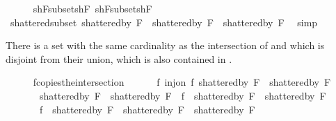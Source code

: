 \begin{isabellebody}
\isanewline
\ \ \ \ \isamarkupfalse%
\ shF{}{\isacharunderscore}{\kern0pt}subset{\isacharunderscore}{\kern0pt}shF\ shF{}{\isacharunderscore}{\kern0pt}subset{\isacharunderscore}{\kern0pt}shF\ \isanewline
\ \ \ \ \isamarkupfalse%
\ shattered{\isacharunderscore}{\kern0pt}subset{\isacharcolon}{\kern0pt}\ {\isachardoublequoteopen}{\isacharparenleft}{\kern0pt}shattered{\isacharunderscore}{\kern0pt}by\ {\isacharquery}{\kern0pt}F{}{\isacharparenright}{\kern0pt}\ {\isasymunion}\ {\isacharparenleft}{\kern0pt}shattered{\isacharunderscore}{\kern0pt}by\ {\isacharquery}{\kern0pt}F{}{\isacharparenright}{\kern0pt}\ {\isasymsubseteq}\ shattered{\isacharunderscore}{\kern0pt}by\ F{\isachardoublequoteclose}\ \isamarkupfalse%
\ simp%
\begin{isamarkuptext}%
There is a set with the same cardinality as the intersection of 
         and  which is disjoint from their union, 
        which is also contained in .%
\end{isamarkuptext}\isamarkuptrue%
\ \ \ \ \isamarkupfalse%
\ f{\isacharunderscore}{\kern0pt}copies{\isacharunderscore}{\kern0pt}the{\isacharunderscore}{\kern0pt}intersection{\isacharcolon}{\kern0pt}\isanewline
\ \ \ \ \ \ {\isachardoublequoteopen}{\isasymexists}f{\isachardot}{\kern0pt}\ inj{\isacharunderscore}{\kern0pt}on\ f\ {\isacharparenleft}{\kern0pt}shattered{\isacharunderscore}{\kern0pt}by\ {\isacharquery}{\kern0pt}F{}\ {\isasyminter}\ shattered{\isacharunderscore}{\kern0pt}by\ {\isacharquery}{\kern0pt}F{}{\isacharparenright}{\kern0pt}\ {\isasymand}\isanewline
\ \ \ \ \ \ \ {\isacharparenleft}{\kern0pt}shattered{\isacharunderscore}{\kern0pt}by\ {\isacharquery}{\kern0pt}F{}\ {\isasymunion}\ shattered{\isacharunderscore}{\kern0pt}by\ {\isacharquery}{\kern0pt}F{}{\isacharparenright}{\kern0pt}\ {\isasyminter}\ {\isacharparenleft}{\kern0pt}f\ {\isacharbackquote}{\kern0pt}\ {\isacharparenleft}{\kern0pt}shattered{\isacharunderscore}{\kern0pt}by\ {\isacharquery}{\kern0pt}F{}\ {\isasyminter}\ shattered{\isacharunderscore}{\kern0pt}by\ {\isacharquery}{\kern0pt}F{}{\isacharparenright}{\kern0pt}{\isacharparenright}{\kern0pt}\ {\isacharequal}{\kern0pt}\ {\isacharbraceleft}{\kern0pt}{\isacharbraceright}{\kern0pt}\ {\isasymand}\isanewline
\ \ \ \ \ \ \ f\ {\isacharbackquote}{\kern0pt}\ {\isacharparenleft}{\kern0pt}shattered{\isacharunderscore}{\kern0pt}by\ {\isacharquery}{\kern0pt}F{}\ {\isasyminter}\ shattered{\isacharunderscore}{\kern0pt}by\ {\isacharquery}{\kern0pt}F{}{\isacharparenright}{\kern0pt}\ {\isasymsubseteq}\ shattered{\isacharunderscore}{\kern0pt}by\ F{\isachardoublequoteclose}\isanewline

\end{isabellebody}
